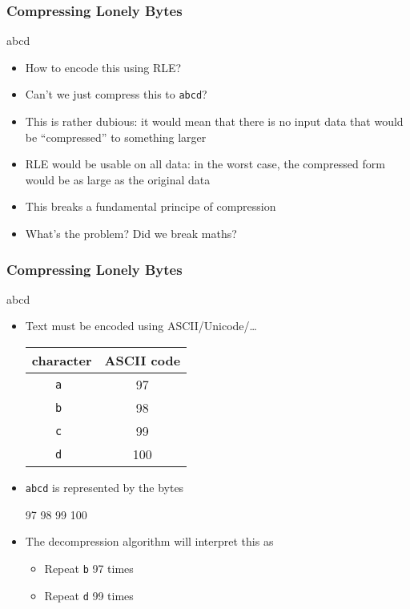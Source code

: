 \begin{frame}
  \frametitle{Compressing Lonely Bytes}
  \begin{center}
    abcd
  \end{center}
  \begin{itemize}
    \item How to encode this using RLE?
    \item Can't we just compress this to \texttt{abcd}?
    \item This is rather dubious: it would mean that there is no input data
          that would be ``compressed'' to something larger
    \item RLE would be usable on all data: in the worst case, the compressed
          form would be as large as the original data
    \item This breaks a fundamental principe of compression
    \item What's the problem? Did we break maths?
  \end{itemize}
\end{frame}

\begin{frame}
  \frametitle{Compressing Lonely Bytes}
  \begin{center}
    abcd
  \end{center}
  \begin{itemize}
    \item Text must be encoded using ASCII/Unicode/\dots
          \begin{center} \small
            \begin{tabular}{cc}
              \textbf{character} & \textbf{ASCII code} \\
              \toprule
              \tt a & 97 \\
              \tt b & 98 \\
              \tt c & 99 \\
              \tt d & 100 \\
            \end{tabular}
          \end{center}
    \item {\tt abcd} is represented by the bytes
          \begin{center}
            97 98 99 100
          \end{center}
    \item The decompression algorithm will interpret this as
          \begin{itemize}
            \item Repeat \texttt{b} 97 times
            \item Repeat \texttt{d} 99 times
          \end{itemize}
  \end{itemize}
\end{frame}

